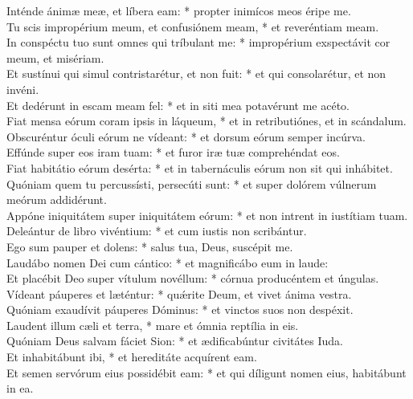 {	Inténde ánimæ meæ, et líbera eam: * propter inimícos meos éripe me. \\
	Tu scis impropérium meum, et confusiónem meam, * et reveréntiam meam. \\
	In conspéctu tuo sunt omnes qui tríbulant me: * impropérium exspectávit cor meum, et misériam. \\
	Et sustínui qui simul contristarétur, et non fuit: * et qui consolarétur, et non invéni. \\
	Et dedérunt in escam meam fel: * et in siti mea potavérunt me acéto. \\
	Fiat mensa eórum coram ipsis in láqueum, * et in retributiónes, et in scándalum. \\
	Obscuréntur óculi eórum ne vídeant: * et dorsum eórum semper incúrva. \\
	Effúnde super eos iram tuam: * et furor iræ tuæ comprehéndat eos. \\
	Fiat habitátio eórum desérta: * et in tabernáculis eórum non sit qui inhábitet. \\
	Quóniam quem tu percussísti, persecúti sunt: * et super dolórem vúlnerum meórum addidérunt. \\
	Appóne iniquitátem super iniquitátem eórum: * et non intrent in iustítiam tuam. \\
	Deleántur de libro vivéntium: * et cum iustis non scribántur. \\
	Ego sum pauper et dolens: * salus tua, Deus, suscépit me. \\
	Laudábo nomen Dei cum cántico: * et magnificábo eum in laude: \\
	Et placébit Deo super vítulum novéllum: * córnua producéntem et úngulas. \\
	Vídeant páuperes et læténtur: * quǽrite Deum, et vivet ánima vestra. \\
	Quóniam exaudívit páuperes Dóminus: * et vinctos suos non despéxit. \\
	Laudent illum cæli et terra, * mare et ómnia reptília in eis. \\
	Quóniam Deus salvam fáciet Sion: * et ædificabúntur civitátes Iuda. \\
	Et inhabitábunt ibi, * et hereditáte acquírent eam. \\
	Et semen servórum eius possidébit eam: * et qui díligunt nomen eius, habitábunt in ea.
}


